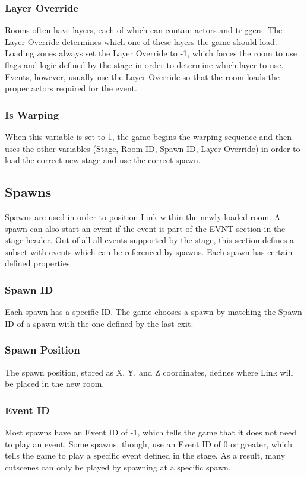 \documentclass[titlepage,12pt,a4paper]{article}
\begin{document}
\subsubsection{Layer Override}
Rooms often have layers, each of which can contain actors and triggers. The Layer Override determines which one of these layers the game should load. Loading zones always set the Layer Override to -1, which forces the room to use flags and logic defined by the stage in order to determine which layer to use. Events, however, usually use the Layer Override so that the room loads the proper actors required for the event.

\subsubsection{Is Warping}
When this variable is set to 1, the game begins the warping sequence and then uses the other variables (Stage, Room ID, Spawn ID, Layer Override) in order to load the correct new stage and use the correct spawn.

\subsection{Spawns}
Spawns are used in order to position Link within the newly loaded room. A spawn can also start an event if the event is part of the EVNT section in the stage header. Out of all all events supported by the stage, this section defines a subset with events which can be referenced by spawns. Each spawn has certain defined properties.

\subsubsection{Spawn ID}
Each spawn has a specific ID. The game chooses a spawn by matching the Spawn ID of a spawn with the one defined by the last exit.

\subsubsection{Spawn Position}
The spawn position, stored as X, Y, and Z coordinates, defines where Link will be placed in the new room.

\subsubsection{Event ID}
Most spawns have an Event ID of -1, which tells the game that it does not need to play an event. Some spawns, though, use an Event ID of 0 or greater, which tells the game to play a specific event defined in the stage. As a result, many cutscenes can only be played by spawning at a specific spawn.
\end{document}
